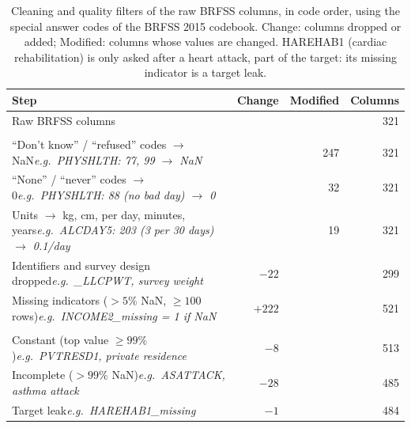 \begin{table}[t]
  \centering
  \caption{Cleaning and quality filters of the raw BRFSS columns, in code order,
    using the special answer codes of the BRFSS 2015 codebook. Change: columns
    dropped or added; Modified: columns whose values are changed. HAREHAB1 (cardiac
    rehabilitation) is only asked after a heart attack, part of the target: its
    missing indicator is a target leak.}
  \label{tab:cleaning}
  \footnotesize
  \setlength{\tabcolsep}{4pt}
  \setlength{\aboverulesep}{0pt}
  \setlength{\belowrulesep}{0pt}
  \renewcommand{\arraystretch}{1.3}
  \newcommand{\step}[2]{#1\newline\hspace*{1em}\textit{e.g.\ #2}}
  \newcommand{\phase}[1]{\multicolumn{1}{@{}l|}{\textbf{#1}} & & & \\}
  \begin{tabularx}{\linewidth}{@{}>{\raggedright\arraybackslash}X|r|r|r@{}}
    \toprule
    Step & Change & Modified & Columns \\
    \midrule
    Raw BRFSS columns & & & 321 \\
    \phase{Cleaning}
    \step{``Don't know'' / ``refused'' codes $\rightarrow$ NaN}{PHYSHLTH: 77, 99 $\rightarrow$ NaN} & & 247 & 321 \\
    \step{``None'' / ``never'' codes $\rightarrow$ 0}{PHYSHLTH: 88 (no bad day) $\rightarrow$ 0} & & 32 & 321 \\
    \step{Units $\rightarrow$ kg, cm, per day, minutes, years}{ALCDAY5: 203 (3 per 30 days) $\rightarrow$ 0.1/day} & & 19 & 321 \\
    \step{Identifiers and survey design dropped}{\_LLCPWT, survey weight} & $-22$ & & 299 \\
    \step{Missing indicators ($> 5\%$ NaN, $\geq 100$ rows)}{INCOME2\_missing = 1 if NaN} & $+222$ & & 521 \\
    \phase{Quality filters}
    \step{Constant (top value $\geq 99\%$)}{PVTRESD1, private residence} & $-8$ & & 513 \\
    \step{Incomplete ($> 99\%$ NaN)}{ASATTACK, asthma attack} & $-28$ & & 485 \\
    \step{Target leak}{HAREHAB1\_missing} & $-1$ & & 484 \\
    \bottomrule
  \end{tabularx}
\end{table}
